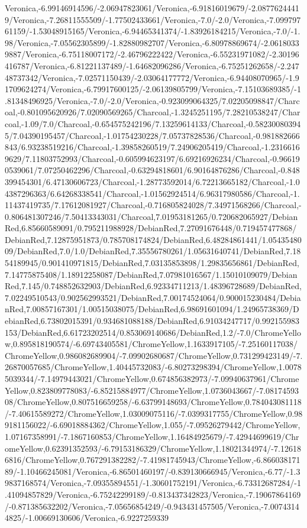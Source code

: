 {\begin{tikzternal}
Veronica,-6.99146914596/-2.06947823061/Veronica,-6.91816019679/-2.08776244419/Veronica,-7.26811555509/-1.77502433661/Veronica,-7.0/-2.0/Veronica,-7.09979761159/-1.53048915165/Veronica,-6.94465341374/-1.83926184215/Veronica,-7.0/-1.98/Veronica,-7.05562305899/-1.82880982707/Veronica,-6.80978869674/-2.06180339887/Veronica,-6.75118007172/-2.46796222422/Veronica,-6.55231971082/-2.30196416787/Veronica,-6.81221137489/-1.64682096286/Veronica,-6.75251262658/-2.24748737342/Veronica,-7.02571150439/-2.03064177772/Veronica,-6.94408070965/-1.91709624274/Veronica,-6.79917600125/-2.06139805799/Veronica,-7.15103689385/-1.81348496925/Veronica,-7.0/-2.0/Veronica,-0.923099064325/7.02205098847/Charcoal,-0.801095620926/7.02090569265/Charcoal,-1.3245251195/7.28210538247/Charcoal,-1.09/7.0/Charcoal,-0.654575242196/7.13259614133/Charcoal,-0.582300803945/7.04390195457/Charcoal,-1.01754230228/7.05737828536/Charcoal,-0.981882666843/6.93238519216/Charcoal,-1.39858260519/7.24906205419/Charcoal,-1.23166169629/7.11803752993/Charcoal,-0.605994623197/6.69216926234/Charcoal,-0.966190539061/7.07250462296/Charcoal,-0.63294818601/6.90164876286/Charcoal,-0.848399454301/6.47130606723/Charcoal,-1.28773592014/6.72213665182/Charcoal,-1.04387296363/6.64268338541/Charcoal,-1.01562924514/6.96317980586/Charcoal,-1.11437419735/7.17612081927/Charcoal,-0.716805824028/7.34971568266/Charcoal,-0.806481307246/7.50413343031/Charcoal,7.01953181265/0.720682065927/DebianRed,6.85660589091/0.795211988928/DebianRed,7.27091676448/0.719457477868/DebianRed,7.12875951873/0.785708174824/DebianRed,6.48284861441/1.0543548009/DebianRed,7.0/1.0/DebianRed,7.35556780261/1.05631640741/DebianRed,7.1854189945/0.901410971815/DebianRed,7.03135853898/1.29835656861/DebianRed,7.14775875408/1.18912258087/DebianRed,7.07981016567/1.15010109079/DebianRed,7.145/0.748852632903/DebianRed,6.92334711213/1.48396728689/DebianRed,7.02249510543/0.902562993521/DebianRed,7.00174524064/0.900015230484/DebianRed,7.00857167301/1.00515038075/DebianRed,6.98691601094/1.24965738369/DebianRed,6.73802015391/0.934681088188/DebianRed,6.91034247717/0.992155983153/DebianRed,6.61723202514/0.853069140686/DebianRed,1.2/-7.0/ChromeYellow,0.895818190574/-6.69743405581/ChromeYellow,1.1633917105/-7.25160117038/ChromeYellow,0.986082689904/-7.09902680687/ChromeYellow,0.731299423149/-7.26870057685/ChromeYellow,1.40445732083/-6.80273298394/ChromeYellow,1.00785039344/-7.14979443021/ChromeYellow,0.674856382973/-7.09940637961/ChromeYellow,0.823809778083/-6.85215884977/ChromeYellow,1.0736043667/-7.0817459308/ChromeYellow,0.807516659258/-6.63799148693/ChromeYellow,0.784043081118/-7.40615589272/ChromeYellow,1.03009075116/-7.0399317755/ChromeYellow,0.989181156022/-6.69018884362/ChromeYellow,1.055/-7.09526279442/ChromeYellow,1.07167358991/-7.1867160853/ChromeYellow,1.16484925679/-7.42944699619/ChromeYellow,0.62391352593/-6.79153186329/ChromeYellow,1.18021344974/-7.126186816/ChromeYellow,0.767291382282/-7.41981745943/ChromeYellow,-6.86603817189/-1.10466245081/Veronica,-6.86501460197/-0.839130666945/Veronica,-6.77/-1.39837168574/Veronica,-7.09355894551/-1.30601752191/Veronica,-6.73312687284/-1.41094857829/Veronica,-6.75242299189/-0.813437342823/Veronica,-7.19067864169/-0.871385632202/Veronica,-7.05656854249/-0.943431457505/Veronica,-7.00743144825/-1.00669130606/Veronica,-6.9227259339
\end{tikzternal}}
